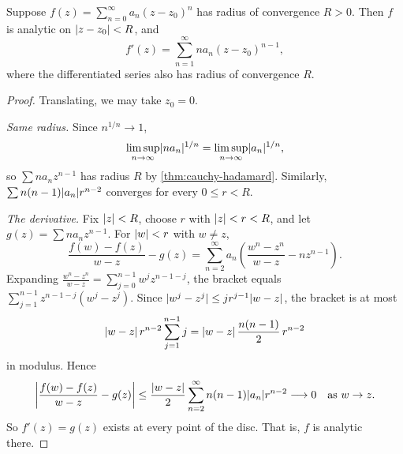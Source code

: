 \begin{theorem}\label{thm:termwise}
  Suppose $f(z) = \sum_{n=0}^{\infty} a_n (z - z_0)^n$ has radius of
  convergence $R > 0$. Then $f$ is analytic on $\abs{z - z_0} < R$, and
  \[
    f'(z) = \sum_{n=1}^{\infty} n a_n (z - z_0)^{n-1},
  \]
  where the differentiated series also has radius of convergence $R$.
\end{theorem}

\begin{proof}
  Translating, we may take $z_0 = 0$.

  \emph{Same radius.} Since $n^{1/n} \to 1$,
  \[
    \limsup_{n \to \infty} \abs{n a_n}^{1/n}
    = \limsup_{n \to \infty} \abs{a_n}^{1/n},
  \]
  so $\sum n a_n z^{n-1}$ has radius $R$ by \cref{thm:cauchy-hadamard}.
  Similarly, $\sum n(n-1) \abs{a_n} r^{n-2}$ converges for every $0 \leq r < R$.

  \emph{The derivative.} Fix $\abs{z} < R$, choose $r$ with $\abs{z} < r < R$,
  and let $g(z) = \sum n a_n z^{n-1}$. For $\abs{w} < r$ with $w \neq z$,
  \[
    \frac{f(w) - f(z)}{w - z} - g(z)
    = \sum_{n=2}^{\infty} a_n \left( \frac{w^n - z^n}{w - z} - n z^{n-1} \right).
  \]
  Expanding $\frac{w^n - z^n}{w - z} = \sum_{j=0}^{n-1} w^j z^{n-1-j}$, the
  bracket equals $\sum_{j=1}^{n-1} z^{n-1-j} (w^j - z^j)$. Since
  $\abs{w^j - z^j} \leq j r^{j-1} \abs{w - z}$, the bracket is at most
  \[
    \abs{w - z} \, r^{n-2} \sum_{j=1}^{n-1} j
    = \abs{w - z} \, \frac{n(n-1)}{2} \, r^{n-2}
  \]
  in modulus. Hence
  \[
    \abs*{\frac{f(w) - f(z)}{w - z} - g(z)}
    \leq \frac{\abs{w - z}}{2} \sum_{n=2}^{\infty} n(n-1) \abs{a_n} r^{n-2}
    \longrightarrow 0
    \quad \text{as } w \to z.
  \]
  So $f'(z) = g(z)$ exists at every point of the disc. That is, $f$ is
  analytic there.
\end{proof}
